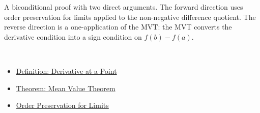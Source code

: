 \begin{remark*}
A biconditional proof with two direct arguments. The forward direction uses order preservation for limits applied to the non-negative difference quotient. The reverse direction is a one-application of the MVT: the MVT converts the derivative condition into a sign condition on $f(b) - f(a)$.
\end{remark*}

\begin{remark*}[Dependencies]~\\
\begin{itemize}
  \item \hyperref[def:derivative-at-a-point]{Definition: Derivative at a Point}
  \item \hyperref[thm:mean-value-theorem]{Theorem: Mean Value Theorem}
  \item \hyperref[thm:order-preservation-limits]{Order Preservation for Limits}
\end{itemize}
\end{remark*}

\clearpage
